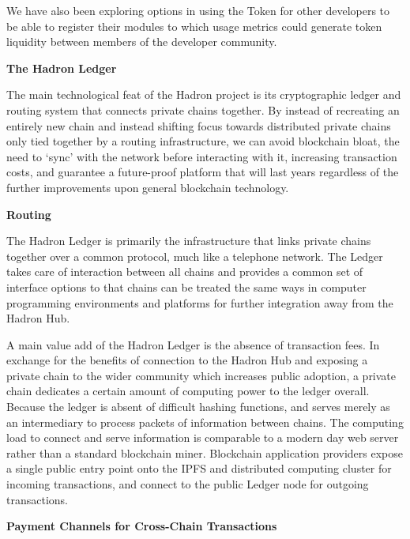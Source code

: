 \documentclass{%
	article}
\begin{document}
We have also been exploring options in using the Token for other developers to be able to register their modules to which usage metrics could generate token liquidity between members of the developer community.

\begin{center}
\textbf{The Hadron Ledger}
\end{center}

The main technological feat of the Hadron project is its cryptographic ledger and routing system that connects private chains together. By instead of recreating an entirely new chain and instead shifting focus towards distributed private chains only tied together by a routing infrastructure, we can avoid blockchain bloat, the need to ‘sync’ with the network before interacting with it, increasing transaction costs, and guarantee a future-proof platform that will last years regardless of the further improvements upon general blockchain technology.

\begin{center}
\textbf{Routing}
\end{center}

The Hadron Ledger is primarily the infrastructure that links private chains together over a common protocol, much like a telephone network. The Ledger takes care of interaction between all chains and provides a common set of interface options to that chains can be treated the same ways in computer programming environments and platforms for further integration away from the Hadron Hub.

A main value add of the Hadron Ledger is the absence of transaction fees. In exchange for the benefits of connection to the Hadron Hub and exposing a private chain to the wider community which increases public adoption, a private chain dedicates a certain amount of computing power to the ledger overall. Because the ledger is absent of difficult hashing functions, and serves merely as an intermediary to process packets of information between chains. The computing load to connect and serve information is comparable to a modern day web server rather than a standard blockchain miner. Blockchain application providers expose a single public entry point onto the IPFS and distributed computing cluster for incoming transactions, and connect to the public Ledger node for outgoing transactions.

\begin{center}
\textbf{Payment Channels for Cross-Chain Transactions}
\end{center}
\end{document}
